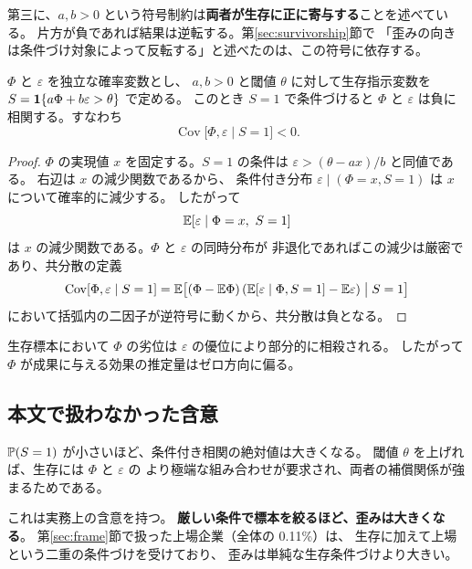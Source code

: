 第三に、$a,b>0$ という符号制約は\textbf{両者が生存に正に寄与する}ことを述べている。
片方が負であれば結果は逆転する。第\ref{sec:survivorship}節で
「歪みの向きは条件づけ対象によって反転する」と述べたのは、この符号に依存する。

\begin{proposition}[合流点バイアス]
\label{prop:collider}
$\Phi$ と $\varepsilon$ を独立な確率変数とし、
$a,b>0$ と閾値 $\theta$ に対して生存指示変数を
$S = \mathbf{1}\{a\Phi + b\varepsilon > \theta\}$ で定める。
このとき $S=1$ で条件づけると $\Phi$ と $\varepsilon$ は負に相関する。すなわち
\[
\operatorname{Cov}\bigl[\Phi,\varepsilon \mid S=1\bigr] < 0 .
\]
\end{proposition}

\begin{proof}
$\Phi$ の実現値 $x$ を固定する。$S=1$ の条件は
$\varepsilon > (\theta - a x)/b$ と同値である。
右辺は $x$ の減少関数であるから、
条件付き分布 $\varepsilon \mid (\Phi=x, S=1)$ は $x$ について確率的に減少する。
したがって
\[
\mathbb{E}[\varepsilon \mid \Phi=x,\ S=1]
\]
は $x$ の減少関数である。$\Phi$ と $\varepsilon$ の同時分布が
非退化であればこの減少は厳密であり、共分散の定義
\[
\operatorname{Cov}[\Phi,\varepsilon\mid S=1]
= \mathbb{E}\bigl[(\Phi-\mathbb{E}\Phi)\,(\mathbb{E}[\varepsilon\mid\Phi,S=1]-\mathbb{E}\varepsilon)\bigm| S=1\bigr]
\]
において括弧内の二因子が逆符号に動くから、共分散は負となる。
\end{proof}

\begin{corollary}[構造効果の過小推定]
生存標本において $\Phi$ の劣位は $\varepsilon$ の優位により部分的に相殺される。
したがって $\Phi$ が成果に与える効果の推定量はゼロ方向に偏る。
\end{corollary}

\subsection{本文で扱わなかった含意}

\begin{remark}[条件づけの強さと歪みの大きさ]
\label{rem:collider-strength}
$\mathbb{P}(S=1)$ が小さいほど、条件付き相関の絶対値は大きくなる。
閾値 $\theta$ を上げれば、生存には $\Phi$ と $\varepsilon$ の
より極端な組み合わせが要求され、両者の補償関係が強まるためである。

これは実務上の含意を持つ。
\textbf{厳しい条件で標本を絞るほど、歪みは大きくなる}。
第\ref{sec:frame}節で扱った上場企業（全体の 0.11\%）は、
生存に加えて上場という二重の条件づけを受けており、
歪みは単純な生存条件づけより大きい。
\end{remark}

